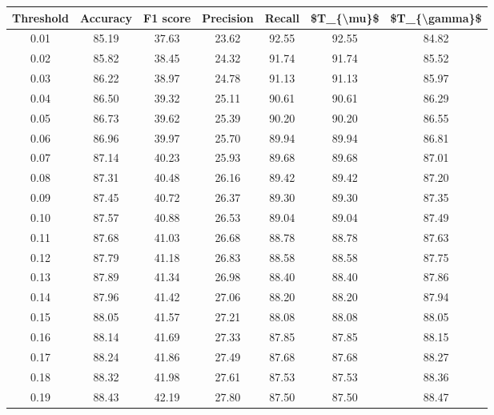 \begin{tabular}{|c|c|c|c|c|c|c|}
\hline
 Threshold &  Accuracy &  F1 score &  Precision &  Recall &  \$T\_\{\textbackslash mu\}\$ &  \$T\_\{\textbackslash gamma\}\$ \\
\hline
      0.01 &     85.19 &     37.63 &      23.62 &   92.55 &      92.55 &         84.82 \\
      0.02 &     85.82 &     38.45 &      24.32 &   91.74 &      91.74 &         85.52 \\
      0.03 &     86.22 &     38.97 &      24.78 &   91.13 &      91.13 &         85.97 \\
      0.04 &     86.50 &     39.32 &      25.11 &   90.61 &      90.61 &         86.29 \\
      0.05 &     86.73 &     39.62 &      25.39 &   90.20 &      90.20 &         86.55 \\
      0.06 &     86.96 &     39.97 &      25.70 &   89.94 &      89.94 &         86.81 \\
      0.07 &     87.14 &     40.23 &      25.93 &   89.68 &      89.68 &         87.01 \\
      0.08 &     87.31 &     40.48 &      26.16 &   89.42 &      89.42 &         87.20 \\
      0.09 &     87.45 &     40.72 &      26.37 &   89.30 &      89.30 &         87.35 \\
      0.10 &     87.57 &     40.88 &      26.53 &   89.04 &      89.04 &         87.49 \\
      0.11 &     87.68 &     41.03 &      26.68 &   88.78 &      88.78 &         87.63 \\
      0.12 &     87.79 &     41.18 &      26.83 &   88.58 &      88.58 &         87.75 \\
      0.13 &     87.89 &     41.34 &      26.98 &   88.40 &      88.40 &         87.86 \\
      0.14 &     87.96 &     41.42 &      27.06 &   88.20 &      88.20 &         87.94 \\
      0.15 &     88.05 &     41.57 &      27.21 &   88.08 &      88.08 &         88.05 \\
      0.16 &     88.14 &     41.69 &      27.33 &   87.85 &      87.85 &         88.15 \\
      0.17 &     88.24 &     41.86 &      27.49 &   87.68 &      87.68 &         88.27 \\
      0.18 &     88.32 &     41.98 &      27.61 &   87.53 &      87.53 &         88.36 \\
      0.19 &     88.43 &     42.19 &      27.80 &   87.50 &      87.50 &         88.47 \\

\end{tabular}
